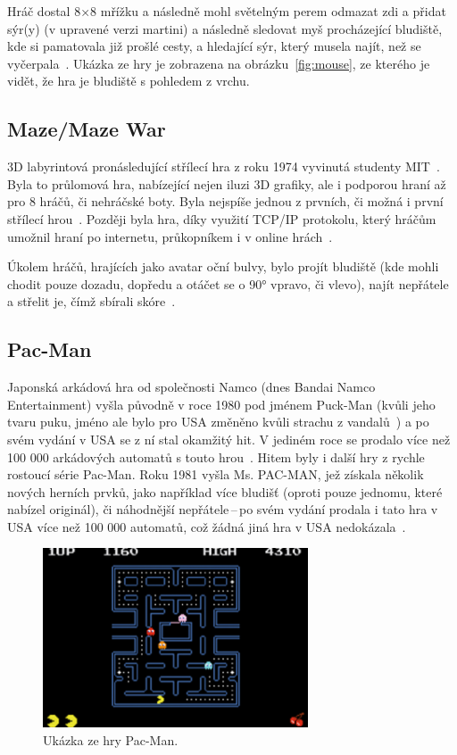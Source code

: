 Hráč dostal 8×8 mřížku a následně mohl světelným perem odmazat zdi a přidat sýr(y) (v upravené verzi martini) a následně sledovat myš procházející bludiště, kde si pamatovala již prošlé cesty, a hledající sýr, který musela najít, než se vyčerpala~\cite{Videogamehistorian}. Ukázka ze hry je zobrazena na obrázku~\ref{fig:mouse}, ze kterého je vidět, že hra je bludiště s pohledem z vrchu.

\subsection*{Maze/Maze War}
3D labyrintová pronásledující střílecí hra z roku 1974 vyvinutá studenty MIT~\cite{Maze_War}. Byla to průlomová hra, nabízející nejen iluzi 3D grafiky, ale i podporou hraní až pro 8 hráčů, či nehráčské boty. Byla nejspíše jednou z prvních, či možná i první střílecí hrou~\cite{virtual_worlds}. Později byla hra, díky využití TCP/IP protokolu, který hráčům umožnil hraní po internetu, průkopníkem i v online hrách~\cite{Maze_War}.

Úkolem hráčů, hrajících jako avatar oční bulvy, bylo projít bludiště (kde mohli chodit pouze dozadu, dopředu a otáčet se o 90° vpravo, či vlevo), najít nepřátele a střelit je, čímž sbírali skóre~\cite{Maze_War}.

\subsection*{Pac-Man}
Japonská arkádová hra od společnosti Namco (dnes Bandai Namco Entertainment) vyšla původně v roce 1980 pod jménem Puck-Man (kvůli jeho tvaru puku, jméno ale bylo pro USA změněno kvůli strachu z vandalů~\cite{kent2010ultimate}) a po svém vydání v USA se z ní stal okamžitý hit. V jediném roce se prodalo více než 100 000 arkádových automatů s touto hrou~\cite{PACMAN}. Hitem byly i další hry z rychle rostoucí série Pac-Man. Roku 1981 vyšla Ms. PAC-MAN, jež získala několik nových herních prvků, jako například více bludišť (oproti pouze jednomu, které nabízel originál), či náhodnější nepřátele\,--\,po svém vydání prodala i tato hra v USA více než 100 000 automatů, což žádná jiná hra v USA nedokázala~\cite{kent2010ultimate}.

\begin{figure}[hb]
	\centering
	\includegraphics[width=0.7\textwidth]{obrazky-figures/ch2/pacman.png}
	\caption{Ukázka ze hry Pac-Man.~\cite{von2007space}}
	\label{fig:pacman}
\end{figure}

